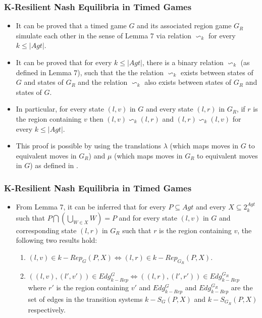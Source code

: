 \documentclass{beamer}
\begin{document}
\begin{frame}
\frametitle{K-Resilient Nash Equilibria in Timed Games}
\begin{itemize}
\item It can be proved that a timed game $G$ and its associated region game $G_{R}$ simulate each other in the sense of Lemma 7 via relation $\backsim_{k}$ for every $k \leq \vert Agt \vert$.
\item It can be proved that for every $k \leq \vert Agt \vert$, there is a binary relation $\backsim_{k}$ (as defined in Lemma 7), such that the the relation $\backsim_{k}$ exists between states of $G$ and states of $G_{R}$ and the relation $\backsim_{k}$ also exists between states of $G_{R}$ and states of $G$.
\item In particular, for every state $(l, v)$ in $G$ and every state $(l, r)$ in $G_{R}$, if $r$ is the region containing $v$ then $(l, v) \backsim_{k} (l, r)$ and $(l, r) \backsim_{k} (l, v)$ for every $k \leq \vert Agt \vert$.
\item This proof is possible by using the translations $\lambda$ (which maps moves in $G$ to equivalent moves in $G_{R}$) and $\mu$ (which maps moves in $G_{R}$ to equivalent moves in $G$) as defined in \cite{BBM-concur10,BBM-report}.
\end{itemize}
\end{frame}

\begin{frame}
\frametitle{K-Resilient Nash Equilibria in Timed Games}
\begin{itemize}
\item From Lemma 7, it can be inferred that for every $P \subseteq Agt$ and every $X \subseteq 2^{Agt}_{k}$ such that $P \bigcap \left( \bigcup \limits_{W \in X}W \right) = P$ and for every state $(l, v)$ in $G$ and corresponding state $(l, r)$ in $G_{R}$ such that $r$ is the region containing $v$, the following two results hold:
\begin{enumerate}
\item $(l, v) \in k-Rep_{G}(P, X) \Leftrightarrow (l, r) \in k-Rep_{G_{R}}(P, X)$.
\item $((l, v), (l', v')) \in Edg_{k-Rep}^{G} \Leftrightarrow ((l, r), (l', r')) \in Edg_{k-Rep}^{G_{R}}$ where $r'$ is the region containing $v'$ and $Edg_{k-Rep}^{G}$ and $Edg_{k-Rep}^{G_{R}}$ are the set of edges in the transition systems $k-S_{G}(P, X)$ and $k-S_{G_{R}}(P, X)$ respectively.
\end{enumerate}
\end{itemize}
\end{frame}
\end{document}
